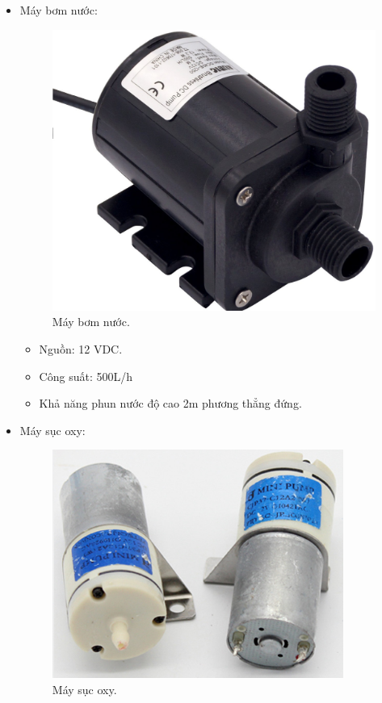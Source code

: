 \documentclass[a4paper,12pt,oneside]{article}
\begin{document}
\begin{itemize}

\item Máy bơm nước:

\begin{figure}[H]
	\centering
	\includegraphics[scale=0.2]{hinh/pump.jpg}
	\caption{Máy bơm nước.}
\end{figure}

\begin{itemize}
\item Nguồn: 12 VDC.
\item Công suất: 500L/h
\item Khả năng phun nước độ cao 2m phương thẳng đứng.
\end{itemize}


\item  Máy sục oxy:

\begin{figure}[H]
\centering
\includegraphics[scale=0.75]{hinh/oxi.png}
\caption{Máy sục oxy.}
\end{figure}


\end{itemize}
\end{document}
